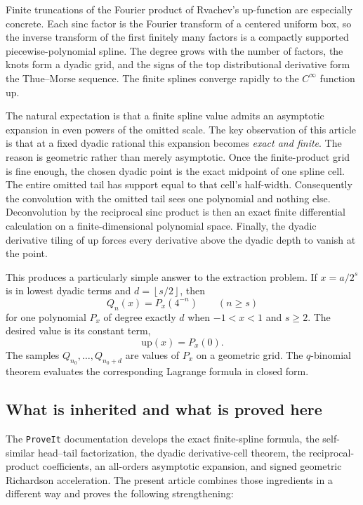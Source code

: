 \documentclass[11pt,oneside]{article}
\numberwithin{equation}{section}
\theoremstyle{definition}
\theoremstyle{remark}
\newcommand{\upf}{\mathrm{up}}
\newcommand{\floor}[1]{\left\lfloor #1\right\rfloor}
\begin{document}
Finite truncations of the Fourier product of Rvachev's up-function are especially
concrete.  Each sinc factor is the Fourier transform of a centered uniform box,
so the inverse transform of the first finitely many factors is a compactly
supported piecewise-polynomial spline.  The degree grows with the number of
factors, the knots form a dyadic grid, and the signs of the top distributional
derivative form the Thue--Morse sequence.  The finite splines converge rapidly
to the $C^\infty$ function $\upf$.

The natural expectation is that a finite spline value admits an asymptotic
expansion in even powers of the omitted scale.  The key observation of this
article is that at a fixed dyadic rational this expansion becomes \emph{exact and
finite}.  The reason is geometric rather than merely asymptotic.  Once the
finite-product grid is fine enough, the chosen dyadic point is the exact midpoint
of one spline cell.  The entire omitted tail has support equal to that cell's
half-width.  Consequently the convolution with the omitted tail sees one
polynomial and nothing else.  Deconvolution by the reciprocal sinc product is
then an exact finite differential calculation on a finite-dimensional polynomial
space.  Finally, the dyadic derivative tiling of $\upf$ forces every derivative
above the dyadic depth to vanish at the point.

This produces a particularly simple answer to the extraction problem.  If
$x=a/2^s$ is in lowest dyadic terms and $d=\floor{s/2}$, then
\[
 Q_n(x)=P_x(4^{-n})\qquad(n\ge s)
\]
for one polynomial $P_x$ of degree exactly $d$ when $-1<x<1$ and $s\ge2$.
The desired value is its constant term,
\[
 \upf(x)=P_x(0).
\]
The samples $Q_{n_0},\ldots,Q_{n_0+d}$ are values of $P_x$ on a geometric grid.
The $q$-binomial theorem evaluates the corresponding Lagrange formula in closed
form.

\subsection{What is inherited and what is proved here}

The \texttt{ProveIt} documentation develops the exact finite-spline formula,
the self-similar head--tail factorization, the dyadic derivative-cell theorem,
the reciprocal-product coefficients, an all-orders asymptotic expansion, and
signed geometric Richardson acceleration.  The present article combines those
ingredients in a different way and proves the following strengthening:
\end{document}
